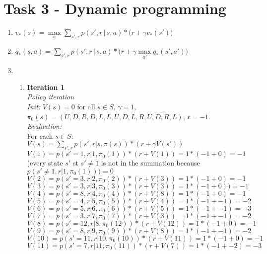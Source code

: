 \documentclass[11pt]{article}
\begin{document}
\section{Task 3 - Dynamic programming}
\begin{enumerate}
	\item $v_*(s) = \max\limits_{a} \sum\limits_{s', r} p(s', r \, | \, s,a) * \big( r + \gamma v_*(s') \big)$
	\item $q_*(s, a) = \sum\limits_{s', r} p(s', r \, | \, s,a) * \big( r + \gamma \max\limits_{a'} q_*(s', a') \big) $
	\item 
	\begin{enumerate}
		\item 
		\textbf{Iteration 1} \\
		\textit{Policy iteration} \\
		\textit{Init:} $V(s) = 0$ for all $s \in S$, $\gamma = 1$, $\pi_0(s) = (U, D, R, D, L, L, U, D, L, R, U, D, R, L)$, $r=-1$. \\
		\textit{Evaluation:} \\
		For each $s \in S$: \\
		$V(s) = \sum\limits_{s',r} p(s', r | s, \pi(s))*(r+\gamma V(s'))$ \\
		$V(1) = p(s'=1, r| 1, \pi_0(1)) * (r + V(1)) = 1 * (-1 + 0) = -1$ 
		(every state $s'$ st $s' \neq 1$ is not in the summation because $p(s'\neq 1, r | 1, \pi_0(1))) = 0$ \\
		$V(2) = p(s'=3, r | 2, \pi_0(2)) * (r + V(3)) = 1 * (-1+0) = -1$ \\
		$V(3) = p(s'=3, r | 3, \pi_0(3)) *(r+ V(3)) = 1 * (-1+0)) = -1$ \\
		$V(4) = p(s'=8, r | 4, \pi_0(4)) * (r + V(8)) = 1 * (-1 + 0) = -1$ \\
		$V(5) = p(s'=4, r | 5, \pi_0(5)) * (r + V(4)) = 1 * (-1 + -1) = -2$ \\
		$V(6) = p(s'=5, r | 6, \pi_0(6)) * (r+ V(5)) = 1 * (-1 + -1) = -3$ \\
		$V(7) = p(s'=3, r | 7, \pi_0(7)) * (r+ V(3)) = 1 * (-1 + -1) = -2$ \\
		$V(8) = p(s'=12, r | 8, \pi_0(12)) * (r + V(12)) = 1* (-1 +0) = -1$ \\
		$V(9) = p(s'=8, r | 9, \pi_0(9)) * (r+V(8)) = 1 * (-1 + -1) = -2$ \\
		$V(10) = p(s'=11, r | 10, \pi_0(10)) * (r + V(11)) = 1 * (-1 + 0) = -1$ \\
		$V(11) = p(s'=7, r | 11, \pi_0(11)) * (r + V(7)) = 1*(-1 + -2) = -3$ \\

\end{enumerate}
\end{enumerate}
\end{document}
